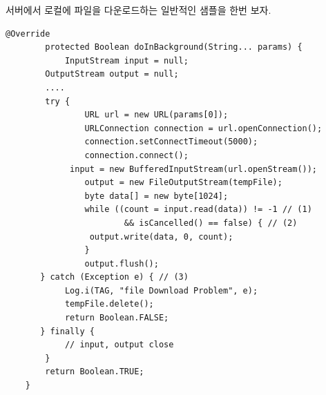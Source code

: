 서버에서 로컬에 파일을 다운로드하는 일반적인 샘플을 한번 보자.
\begin{lstlisting}[frame=single]
    	@Override
    	protected Boolean doInBackground(String... params) {
    		InputStream input = null;
		OutputStream output = null;
		....
        try {
            	URL url = new URL(params[0]);
            	URLConnection connection = url.openConnection();
            	connection.setConnectTimeout(5000);
            	connection.connect();
	       	 input = new BufferedInputStream(url.openStream());
            	output = new FileOutputStream(tempFile);
            	byte data[] = new byte[1024];
            	while ((count = input.read(data)) != -1 // (1)
            			&& isCancelled() == false) { // (2)
				 output.write(data, 0, count);
            	}
            	output.flush();
       } catch (Exception e) { // (3)
            Log.i(TAG, "file Download Problem", e);
            tempFile.delete();
            return Boolean.FALSE; 
       } finally {
            // input, output close
        }
        return Boolean.TRUE;
	}        
\end{lstlisting}
